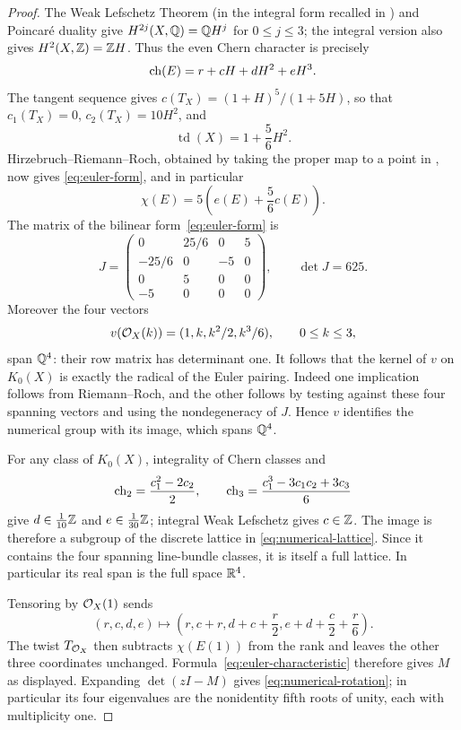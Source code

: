 \begin{proof}
The Weak Lefschetz Theorem (in the integral form recalled in
\cite[Theorem~3]{Catanese2014}) and Poincar\'e duality give
$H^{2j}(X,\mathbb Q)=\mathbb Q H^j$ for $0\le j\le3$; the integral version also
gives $H^2(X,\mathbb Z)=\mathbb Z H$. Thus the even Chern character is precisely
\[
 \operatorname{ch}(E)=r+cH+dH^2+eH^3.
\]
The tangent sequence gives
$c(T_X)=(1+H)^5/(1+5H)$, so that $c_1(T_X)=0$,
$c_2(T_X)=10H^2$, and
\[
 \operatorname{td}(X)=1+\frac56H^2.
\]
Hirzebruch--Riemann--Roch, obtained by taking the proper map to a point in
\cite[Section~7]{BorelSerre1958}, now gives \eqref{eq:euler-form}, and in
particular
\begin{equation}\label{eq:euler-characteristic}
 \chi(E)=5\left(e(E)+\frac56c(E)\right).
\end{equation}
The matrix of the bilinear form~\eqref{eq:euler-form} is
\[
 J=\begin{pmatrix}
 0&25/6&0&5\\
 -25/6&0&-5&0\\
 0&5&0&0\\
 -5&0&0&0
 \end{pmatrix},
 \qquad\det J=625.
\]
Moreover the four vectors
\[
 v(\mathcal O_X(k))=(1,k,k^2/2,k^3/6),\qquad 0\le k\le3,
\]
span $\mathbb Q^4$: their row matrix has determinant one. It follows that
the kernel of $v$ on $K_0(X)$ is exactly the radical of the Euler
pairing. Indeed one implication follows from Riemann--Roch, and the
other follows by testing against these four spanning vectors and using
the nondegeneracy of $J$. Hence $v$ identifies the numerical group with
its image, which spans $\mathbb Q^4$.

For any class of $K_0(X)$, integrality of Chern classes and
\[
 \operatorname{ch}_2=\frac{c_1^2-2c_2}{2},\qquad
 \operatorname{ch}_3=\frac{c_1^3-3c_1c_2+3c_3}{6}
\]
give $d\in\tfrac1{10}\mathbb Z$ and $e\in\tfrac1{30}\mathbb Z$; integral Weak
Lefschetz gives $c\in\mathbb Z$. The image is therefore a subgroup of the
discrete lattice in \eqref{eq:numerical-lattice}. Since it contains the
four spanning line-bundle classes, it is itself a full lattice.
In particular its real span is the full space $\mathbb R^4$.

Tensoring by $\mathcal O_X(1)$ sends
\[
 (r,c,d,e)\longmapsto
 \left(r,c+r,d+c+\frac r2,e+d+\frac c2+\frac r6\right).
\]
The twist $T_{\mathcal O_X}$ then subtracts $\chi(E(1))$ from the rank and leaves
the other three coordinates unchanged. Formula~\eqref{eq:euler-characteristic}
therefore gives $M$ as displayed. Expanding $\det(zI-M)$ gives
\eqref{eq:numerical-rotation}; in particular its four eigenvalues are
the nonidentity fifth roots of unity, each with multiplicity one.
\end{proof}

